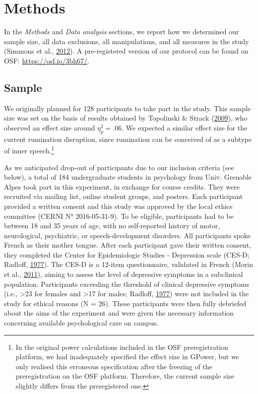 \documentclass[a4paper,12pt,twoside,onecolumn,openright,final,oldfontcommands]{memoir}
\let\rmarkdownfootnote\footnote%
\def\footnote{\protect\rmarkdownfootnote}
\begin{document}
\hypertarget{methods-3}{%
\section{Methods}\label{methods-3}}

In the \emph{Methods} and \emph{Data analysis} sections, we report how we determined our sample size, all data exclusions, all manipulations, and all measures in the study (Simmons et al., \protect\hyperlink{ref-simmons_21_2012}{2012}). A pre-registered version of our protocol can be found on OSF: \url{https://osf.io/3bh67/}.

\hypertarget{sample}{%
\subsection{Sample}\label{sample}}

We originally planned for 128 participants to take part in the study. This sample size was set on the basis of results obtained by Topolinski \& Strack (\protect\hyperlink{ref-topolinski_motormouth_2009}{2009}), who observed an effect size around \(\eta_{p}^{2}=.06\). We expected a similar effect size for the current rumination disruption, since rumination can be conceived of as a subtype of inner speech.\footnote{In the original power calculations included in the OSF preregistration platform, we had inadequately specified the effect size in GPower, but we only realised this erroneous specification after the freezing of the preregistration on the OSF platform. Therefore, the current sample size slightly differs from the preregistered one.}

As we anticipated drop-out of participants due to our inclusion criteria (see below), a total of 184 undergraduate students in psychology from Univ. Grenoble Alpes took part in this experiment, in exchange for course credits. They were recruited via mailing list, online student groups, and posters. Each participant provided a written consent and this study was approved by the local ethics committee (CERNI N° 2016-05-31-9). To be eligible, participants had to be between 18 and 35 years of age, with no self-reported history of motor, neurological, psychiatric, or speech-development disorders. All participants spoke French as their mother tongue. After each participant gave their written consent, they completed the Center for Epidemiologic Studies - Depression scale (CES-D; Radloff, \protect\hyperlink{ref-radloff_ces-d_1977}{1977}). The CES-D is a 12-item questionnaire, validated in French (Morin et al., \protect\hyperlink{ref-morin_psychometric_2011}{2011}), aiming to assess the level of depressive symptoms in a subclinical population. Participants exceeding the threshold of clinical depressive symptoms (i.e., \textgreater23 for females and \textgreater17 for males; Radloff, \protect\hyperlink{ref-radloff_ces-d_1977}{1977}) were not included in the study for ethical reasons (N = 26). These participants were then fully debriefed about the aims of the experiment and were given the necessary information concerning available psychological care on campus.
\end{document}
